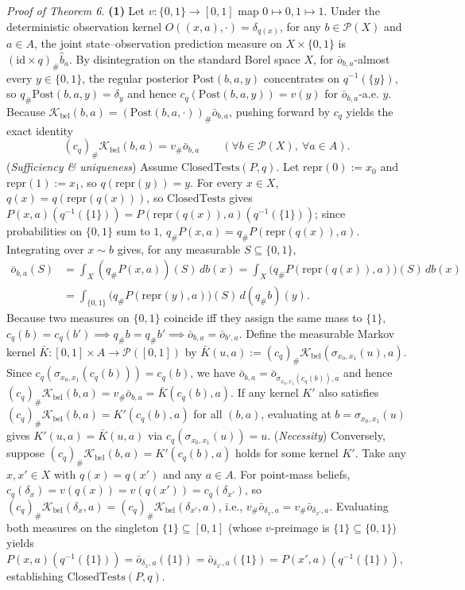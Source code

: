 \documentclass[11pt,a4paper]{article}
\begin{document}
\emph{Proof of Theorem 6.} \textbf{(1)} Let \(v: \{0,1\} \to [0,1]\) map
\(0 \mapsto 0, 1 \mapsto 1\). Under the deterministic observation kernel
\(O((x,a), \cdot) = \delta_{q(x)}\), for any \(b \in \mathcal{P}(X)\)
and \(a \in A\), the joint state--observation prediction measure on
\(X \times \{0,1\}\) is \((\mathrm{id} \times q)_\# \widehat{b}_a\). By
disintegration on the standard Borel space \(X\), for
\(\bar{o}_{b,a}\)-almost every \(y \in \{0,1\}\), the regular posterior
\(\mathrm{Post}(b,a,y)\) concentrates on \(q^{-1}(\{y\})\), so
\(q_\# \mathrm{Post}(b,a,y) = \delta_y\) and hence
\(c_q(\mathrm{Post}(b,a,y)) = v(y)\) for \(\bar{o}_{b,a}\)-a.e. \(y\).
Because
\(\mathcal{K}_{\mathrm{bel}}(b,a) = (\mathrm{Post}(b,a,\cdot))_\# \bar{o}_{b,a}\),
pushing forward by \(c_q\) yields the exact identity
\[(c_q)_\# \mathcal{K}_{\mathrm{bel}}(b, a) = v_\# \bar{o}_{b,a} \qquad (\forall b \in \mathcal{P}(X),\ \forall a \in A).\]
(\emph{Sufficiency \& uniqueness}) Assume
\(\mathrm{ClosedTests}(P, q)\). Let \(\mathrm{repr}(0) := x_0\) and
\(\mathrm{repr}(1) := x_1\), so \(q(\mathrm{repr}(y)) = y\). For every
\(x \in X\), \(q(x) = q(\mathrm{repr}(q(x)))\), so
\(\mathrm{ClosedTests}\) gives
\(P(x,a)(q^{-1}(\{1\})) = P(\mathrm{repr}(q(x)), a)(q^{-1}(\{1\}))\);
since probabilities on \(\{0,1\}\) sum to \(1\),
\(q_\# P(x,a) = q_\# P(\mathrm{repr}(q(x)), a)\). Integrating over
\(x \sim b\) gives, for any measurable \(S \subseteq \{0,1\}\),
\[\begin{aligned}
\bar{o}_{b,a}(S) &= \int_X (q_\# P(x,a))(S)\, db(x)
= \int_X \bigl(q_\# P(\mathrm{repr}(q(x)), a)\bigr)(S)\, db(x) \\
&= \int_{\{0,1\}} \bigl(q_\# P(\mathrm{repr}(y), a)\bigr)(S)\, d(q_\# b)(y).
\end{aligned}\] Because two measures on \(\{0,1\}\) coincide iff they
assign the same mass to \(\{1\}\),
\(c_q(b) = c_q(b') \implies q_\# b = q_\# b' \implies \bar{o}_{b,a} = \bar{o}_{b',a}\).
Define the measurable Markov kernel
\(\bar{K}: [0,1] \times A \to \mathcal{P}([0,1])\) by
\(\bar{K}(u, a) := (c_q)_\# \mathcal{K}_{\mathrm{bel}}(\sigma_{x_0,x_1}(u), a)\).
Since \(c_q(\sigma_{x_0,x_1}(c_q(b))) = c_q(b)\), we have
\(\bar{o}_{b,a} = \bar{o}_{\sigma_{x_0,x_1}(c_q(b)), a}\) and hence
\((c_q)_\# \mathcal{K}_{\mathrm{bel}}(b,a) = v_\# \bar{o}_{b,a} = \bar{K}(c_q(b), a)\).
If any kernel \(K'\) also satisfies
\((c_q)_\# \mathcal{K}_{\mathrm{bel}}(b,a) = K'(c_q(b), a)\) for all
\((b,a)\), evaluating at \(b = \sigma_{x_0,x_1}(u)\) gives
\(K'(u,a) = \bar{K}(u,a)\) via \(c_q(\sigma_{x_0,x_1}(u)) = u\).
(\emph{Necessity}) Conversely, suppose
\((c_q)_\# \mathcal{K}_{\mathrm{bel}}(b,a) = K'(c_q(b), a)\) holds for
some kernel \(K'\). Take any \(x, x' \in X\) with \(q(x) = q(x')\) and
any \(a \in A\). For point-mass beliefs,
\(c_q(\delta_x) = v(q(x)) = v(q(x')) = c_q(\delta_{x'})\), so
\((c_q)_\# \mathcal{K}_{\mathrm{bel}}(\delta_x, a) = (c_q)_\# \mathcal{K}_{\mathrm{bel}}(\delta_{x'}, a)\),
i.e., \(v_\# \bar{o}_{\delta_x, a} = v_\# \bar{o}_{\delta_{x'}, a}\).
Evaluating both measures on the singleton \(\{1\} \subseteq [0,1]\)
(whose \(v\)-preimage is \(\{1\} \subseteq \{0,1\}\)) yields
\(P(x,a)(q^{-1}(\{1\})) = \bar{o}_{\delta_x, a}(\{1\}) = \bar{o}_{\delta_{x'}, a}(\{1\}) = P(x',a)(q^{-1}(\{1\}))\),
establishing \(\mathrm{ClosedTests}(P, q)\).
\end{document}
